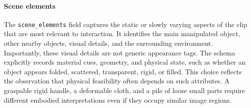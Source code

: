 
\paragraph{Scene elements}
The \texttt{scene\_elements} field captures the static or slowly varying aspects of the clip that are most relevant to interaction. It identifies the main manipulated object, other nearby objects, visual details, and the surrounding environment. Importantly, these visual details are not generic appearance tags. The schema explicitly records material cues, geometry, and physical state, such as whether an object appears folded, scattered, transparent, rigid, or filled. This choice reflects the observation that physical feasibility often depends on such attributes. A graspable rigid handle, a deformable cloth, and a pile of loose small parts require different embodied interpretations even if they occupy similar image regions.

